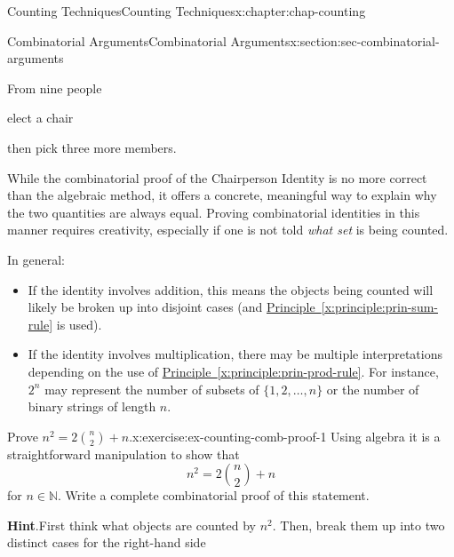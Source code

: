 \documentclass[oneside,10pt,]{book}
\newcommand{\blocktitlefont}{\relax}
\newcommand{\xreffont}{\relax}
\numberwithin{equation}{section}
\begin{document}
\begin{chapterptx}{Counting Techniques}{}{Counting Techniques}{}{}{x:chapter:chap-counting}
\begin{sectionptx}{Combinatorial Arguments}{}{Combinatorial Arguments}{}{}{x:section:sec-combinatorial-arguments}
\begin{sidebyside}{3}{0.085}{0.085}{0.17}
\begin{sbspanel}{0.17}
{
}%
\end{sbspanel}%
\end{sidebyside}%
\begin{sidebyside}{3}{0.085}{0.085}{0.17}%
\begin{sbspanel}{0.15}%
From nine people%
\end{sbspanel}%
\begin{sbspanel}{0.17}%
\par
elect a chair%
\end{sbspanel}%
\begin{sbspanel}{0.17}%
\par
then pick three more members.%
\end{sbspanel}%
\end{sidebyside}%
\par
While the combinatorial proof of the Chairperson Identity is no more correct than the algebraic method, it offers a concrete, meaningful way to explain why the two quantities are always equal. Proving combinatorial identities in this manner requires creativity, especially if one is not told \emph{what set} is being counted.%
\par
In general:%
\begin{itemize}[label=\textbullet]
\item{}If the identity involves addition, this means the objects being counted will likely be broken up into disjoint cases (and \hyperref[x:principle:prin-sum-rule]{Principle~{\xreffont\ref{x:principle:prin-sum-rule}}} is used).%
\item{}If the identity involves multiplication, there may be multiple interpretations depending on the use of \hyperref[x:principle:prin-prod-rule]{Principle~{\xreffont\ref{x:principle:prin-prod-rule}}}. For instance, \(2^n\) may represent the number of subsets of \(\{1,2,\ldots,n\}\) or the number of binary strings of length \(n\).%
\end{itemize}
%
\begin{inlineexercise}{Prove \(n^2 = 2\binom{n}{2} + n\).}{x:exercise:ex-counting-comb-proof-1}%
Using algebra it is a straightforward manipulation to show that%
\begin{equation*}
n^2 = 2\binom{n}{2} + n
\end{equation*}
for \(n \in \mathbb{N}\). Write a complete combinatorial proof of this statement.%
\par\smallskip%
\noindent\textbf{\blocktitlefont Hint}.\hypertarget{g:hint:id530393}{}\quad{}First think what objects are counted by \(n^2\). Then, break them up into two distinct cases for the right-hand side%

\end{inlineexercise}
\end{sectionptx}
\end{chapterptx}
\end{document}
